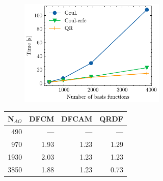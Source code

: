 \begin{figure}[htp]

\begin{subfigure}{\textwidth}
\begin{subfigure}{0.45\textwidth}
\centering
\includegraphics[width=\textwidth]{Pics/hfJ_alkan}
\end{subfigure}
\hfill
\begin{subtable}{0.45\textwidth}
\centering
\begin{tabular}{rrrr}
\hline
N$_{AO}$ & DFCM & DFCAM & QRDF \\ \hline
490 & --- & --- & --- \\ 
970 & 1.93 & 1.23 & 1.29 \\ 
1930 & 2.03 & 1.23 & 1.23 \\ 
3850 & 1.88 & 1.23 & 0.73 \\ \hline
\end{tabular}
\end{subtable}
\caption{}
\label{fig:GS_DFJSCALE_LA}
\end{subfigure}

\vspace{1.5\baselineskip}


\end{figure}
